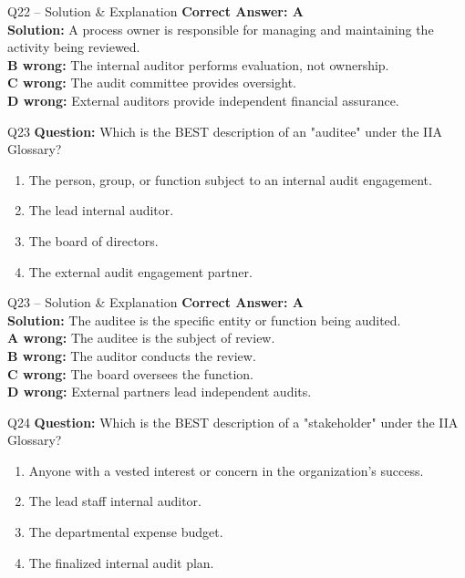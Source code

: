 \documentclass[aspectratio=169,10pt]{beamer}
\begin{document}
	\begin{frame}[t]{Q22 -- Solution \& Explanation}
		\small
		\textbf{Correct Answer: A} \\[4pt]
		\textbf{Solution:} A process owner is responsible for managing and maintaining the activity being reviewed. \\[4pt]
		\textbf{B wrong:} The internal auditor performs evaluation, not ownership. \\[2pt]
		\textbf{C wrong:} The audit committee provides oversight. \\[2pt]
		\textbf{D wrong:} External auditors provide independent financial assurance.
	\end{frame}
	
	\begin{frame}[t]{Q23}
		\small
		\textbf{Question:} Which is the BEST description of an "auditee" under the IIA Glossary?
		\begin{enumerate}[label=\Alph*.,itemsep=1pt,topsep=2pt]
			\item The person, group, or function subject to an internal audit engagement.
			\item The lead internal auditor.
			\item The board of directors.
			\item The external audit engagement partner.
		\end{enumerate}
	\end{frame}
	
	\begin{frame}[t]{Q23 -- Solution \& Explanation}
		\small
		\textbf{Correct Answer: A} \\[4pt]
		\textbf{Solution:} The auditee is the specific entity or function being audited. \\[4pt]
		\textbf{A wrong:} The auditee is the subject of review. \\[2pt]
		\textbf{B wrong:} The auditor conducts the review. \\[2pt]
		\textbf{C wrong:} The board oversees the function. \\[2pt]
		\textbf{D wrong:} External partners lead independent audits.
	\end{frame}
	
	\begin{frame}[t]{Q24}
		\small
		\textbf{Question:} Which is the BEST description of a "stakeholder" under the IIA Glossary?
		\begin{enumerate}[label=\Alph*.,itemsep=1pt,topsep=2pt]
			\item Anyone with a vested interest or concern in the organization's success.
			\item The lead staff internal auditor.
			\item The departmental expense budget.
			\item The finalized internal audit plan.
		\end{enumerate}
	\end{frame}
	
\end{document}
